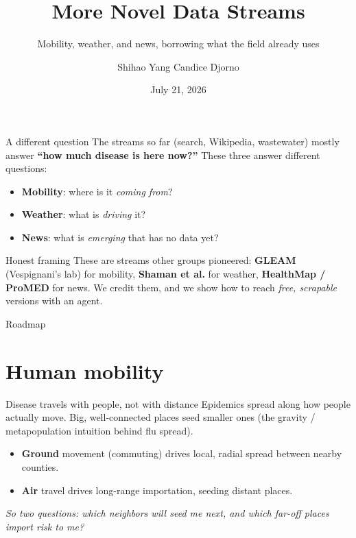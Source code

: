 \documentclass[aspectratio=169,11pt]{beamer}
\title{More Novel Data Streams}
\subtitle{Mobility, weather, and news, borrowing what the field already uses}
\author{Shihao Yang \quad\textbullet\quad Candice Djorno}
\institute{SISMID 2026 \textbullet\ Day 2, 11:00}
\date{July 21, 2026}
\begin{document}
\begin{frame}
  \titlepage
\end{frame}

\begin{frame}{A different question}
  The streams so far (search, Wikipedia, wastewater) mostly answer \textbf{``how much
  disease is here now?''} These three answer different questions:
  \begin{itemize}
    \item \textbf{Mobility}: where is it \emph{coming from}?
    \item \textbf{Weather}: what is \emph{driving} it?
    \item \textbf{News}: what is \emph{emerging} that has no data yet?
  \end{itemize}
  \vspace{0.3em}
  \begin{block}{Honest framing}
    These are streams other groups pioneered: \textbf{GLEAM} (Vespignani's lab) for
    mobility, \textbf{Shaman et al.} for weather, \textbf{HealthMap / ProMED} for news. We
    credit them, and we show how to reach \emph{free, scrapable} versions with an agent.
  \end{block}
\end{frame}

\begin{frame}{Roadmap}
  \tableofcontents
\end{frame}

\section{Human mobility}

\begin{frame}{Disease travels with people, not with distance}
  Epidemics spread along how people actually move. Big, well-connected places seed smaller
  ones (the gravity / metapopulation intuition behind flu spread).
  \begin{itemize}
    \item \textbf{Ground} movement (commuting) drives local, radial spread between nearby
          counties.
    \item \textbf{Air} travel drives long-range importation, seeding distant places.
  \end{itemize}
  \vspace{0.3em}
  \begin{center}
    \itshape So two questions: which neighbors will seed me next, and which far-off places
    import risk to me?
  \end{center}
\end{frame}
\end{document}
